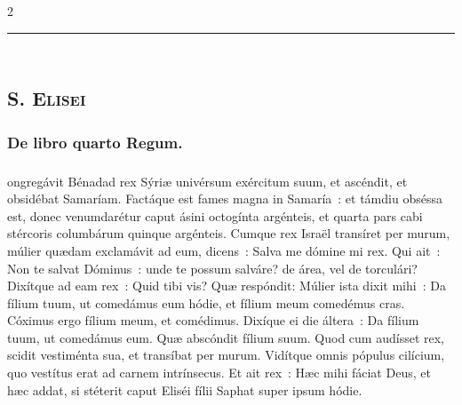 \documentclass[9pt,twoside]{extarticle}
\begin{document}
\begin{multicols}{2}
{\begin{center}\textcolor{red}{\rule{\linewidth}{0.5pt}} \end{center}

\subsection*{\center \textsc{\\
S. Elisei}}
\subsubsection*{\center {}}

\subsubsection*{\center De libro quarto Regum.}
\subsubsection*{\center {}}
ongregávit Bénadad rex Sýriæ univérsum exércitum suum, et ascéndit, et obsidébat Samaríam.
Factáque est fames magna in Samaría~: et támdiu obséssa est, donec venumdarétur caput ásini octogínta argénteis, et quarta pars cabi stércoris columbárum quinque argénteis.
Cumque rex Israël transíret per murum, múlier quædam exclamávit ad eum, dicens~: Salva me dómine mi rex.
Qui ait~: Non te salvat Dóminus~: unde te possum salváre? de área, vel de torculári? Dixítque ad eam rex~: Quid tibi vis? Quæ respóndit:
Múlier ista dixit mihi~: Da fílium tuum, ut comedámus eum hódie, et fílium meum comedémus cras.
Cóximus ergo fílium meum, et comédimus. Dixíque ei die áltera~: Da fílium tuum, ut comedámus eum. Quæ abscóndit fílium suum.
Quod cum audísset rex, scidit vestiménta sua, et transíbat per murum. Vidítque omnis pópulus cilícium, quo vestítus erat ad carnem intrínsecus.
Et ait rex~: Hæc mihi fáciat Deus, et hæc addat, si stéterit caput Eliséi fílii Saphat super ipsum hódie.

\begin{tightlist}{}
\item {}
\end{tightlist}

}
\end{multicols}
\end{document}
